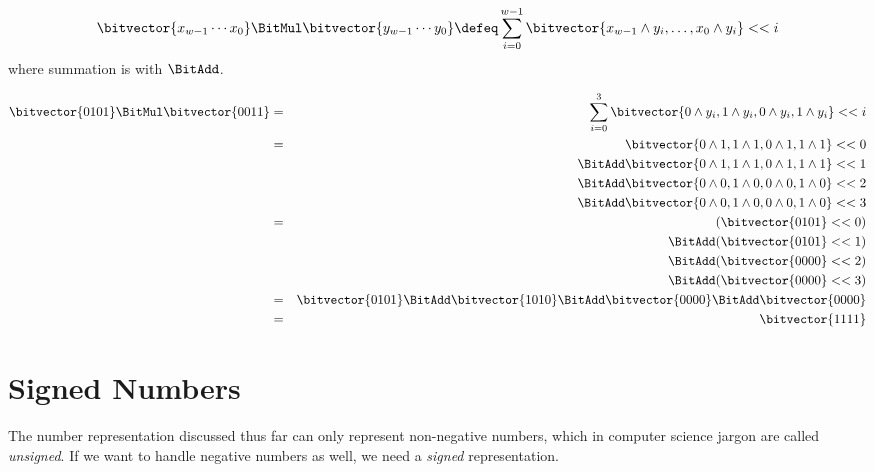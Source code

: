 \begin{definition}
\begin{align*}
  \bitvector{x_{w-1}\cdots{}x_{0}} \BitMul \bitvector{y_{w-1}\cdots{}y_{0}} \defeq
  \sum_{i=0}^{w-1} \bitvector{x_{w-1} \land y_{i},\ldots,x_{0} \land y_{i}} << i
\end{align*}
where summation is with $\BitAdd$.
\end{definition}

\begin{example}[$5 \times 3$]
  \begin{align}
    \bitvector{0101} \BitMul \bitvector{0011} &=& \sum_{i=0}^{3} \bitvector{0 \land y_{i},1\land y_{i}, 0\land y_{i}, 1 \land y_{i}} << i \\
                                              &=& \bitvector{0 \land 1,1\land 1, 0\land 1, 1 \land 1} << 0 \\\nonumber
                                              &&\BitAdd \bitvector{0 \land 1,1\land 1, 0\land 1, 1 \land 1} << 1 \\\nonumber
                                              &&\BitAdd \bitvector{0 \land 0,1\land 0, 0\land 0, 1 \land 0} << 2 \\\nonumber
                                              &&\BitAdd \bitvector{0 \land 0,1\land 0, 0\land 0, 1 \land 0} << 3 \\
                                              &=&         (\bitvector{0101} << 0) \\\nonumber
                                              &&\BitAdd (\bitvector{0101} << 1) \\\nonumber
                                              && \BitAdd (\bitvector{0000} << 2) \\\nonumber
                                              && \BitAdd (\bitvector{0000} << 3) \\
                                              &=& \bitvector{0101} \BitAdd \bitvector{1010} \BitAdd \bitvector{0000}  \BitAdd \bitvector{0000} \\
    &=& \bitvector{1111}
  \end{align}
\end{example}

\section{Signed Numbers}
\label{sec:signed-numbers}

The number representation discussed thus far can only represent
non-negative numbers, which in computer science jargon are called
\emph{unsigned}.  If we want to handle negative numbers as well, we
need a \emph{signed} representation.

